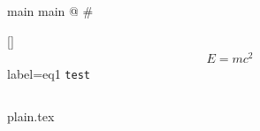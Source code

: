 \documentclass[10pt]{article}
\begin{document}
main main
@
#

\ref{}
\begin{align}
E = mc^{2}
\end{align}
label={eq1}
\lstinline[showlines]{test}
\begin{lstlisting}[print]
\end{lstlisting}


{plain.tex}

\end{document}
